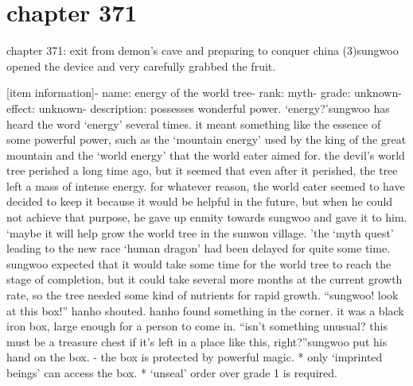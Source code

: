 \section{chapter 371}

chapter 371: exit from demon’s cave and preparing to conquer china (3)sungwoo opened the device and very carefully grabbed the fruit.





[item information]- name: energy of the world tree- rank: myth- grade: unknown- effect: unknown- description: possesses wonderful power.
‘energy?’sungwoo has heard the word ‘energy’ several times.
 it meant something like the essence of some powerful power, such as the ‘mountain energy’ used by the king of the great mountain and the ‘world energy’ that the world eater aimed for.
the devil’s world tree perished a long time ago, but it seemed that even after it perished, the tree left a mass of intense energy.
for whatever reason, the world eater seemed to have decided to keep it because it would be helpful in the future, but when he could not achieve that purpose, he gave up enmity towards sungwoo and gave it to him.
‘maybe it will help grow the world tree in the sunwon village.
’the ‘myth quest’ leading to the new race ‘human dragon’ had been delayed for quite some time.
 sungwoo expected that it would take some time for the world tree to reach the stage of completion, but it could take several more months at the current growth rate, so the tree needed some kind of nutrients for rapid growth.
“sungwoo! look at this box!” hanho shouted.
hanho found something in the corner.
 it was a black iron box, large enough for a person to come in.
“isn’t something unusual? this must be a treasure chest if it’s left in a place like this, right?”sungwoo put his hand on the box.
- the box is protected by powerful magic.
* only ‘imprinted beings’ can access the box.
* ‘unseal’ order over grade 1 is required.

